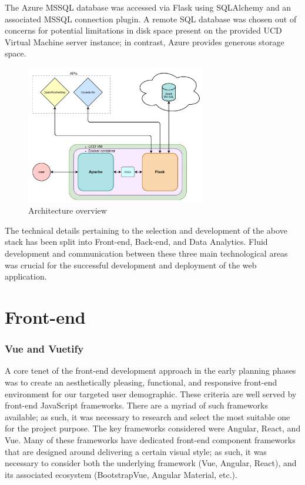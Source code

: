 \documentclass[]{UCD_CS_47360_Report}
\begin{document}
The Azure MSSQL database was accessed via Flask using SQLAlchemy and an associated MSSQL connection plugin. A remote SQL database was chosen out of concerns for potential limitations in disk space present on the provided UCD Virtual Machine server instance; in contrast, Azure provides generous storage space.

\begin{figure}[!htb]
    \centering
    \includegraphics[width=0.7\textwidth]{figures/ArchitectureOverview.PNG}
    \caption{Architecture overview}
    \label{fig:ArchOverview}
\end{figure}

The technical details pertaining to the selection and development of the above stack has been split into Front-end, Back-end, and Data Analytics. Fluid development and communication between these three main technological areas was crucial for the successful development and deployment of the web application.

\section{Front-end}
\subsubsection{Vue and Vuetify}
A core tenet of the front-end development approach in the early planning phases was to create an aesthetically pleasing, functional, and responsive front-end environment for our targeted user demographic. These criteria are well served by front-end JavaScript frameworks. There are a myriad of such frameworks available; as such, it was necessary to research and select the most suitable one for the project purpose. The key frameworks considered were Angular, React, and Vue. Many of these frameworks have dedicated front-end component frameworks that are designed around delivering a certain visual style; as such, it was necessary to consider both the underlying framework (Vue, Angular, React), and its associated ecosystem (BootstrapVue, Angular Material, etc.). 
\end{document}
